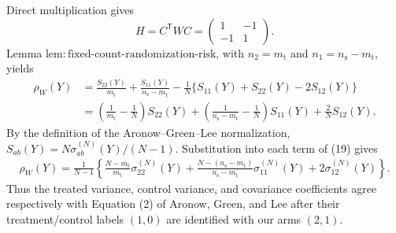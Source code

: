 Direct multiplication gives
\[
H=C^{\mathsf T}WC=
\begin{pmatrix}1&-1\\-1&1\end{pmatrix}. \tag{18}
\]
Lemma \(\mathrm{lem{:}fixed\text{-}count\text{-}randomization\text{-}risk}\), with \(n_2=m_{\mathrm t}\) and \(n_1=n_{\mathrm s}-m_{\mathrm t}\), yields
\[
\begin{aligned}
\rho_W(Y)
&=\frac{S_{22}(Y)}{m_{\mathrm t}}
+\frac{S_{11}(Y)}{n_{\mathrm s}-m_{\mathrm t}}
-\frac1N\{S_{11}(Y)+S_{22}(Y)-2S_{12}(Y)\}\\
&=\left(\frac1{m_{\mathrm t}}-\frac1N\right)S_{22}(Y)
+\left(\frac1{n_{\mathrm s}-m_{\mathrm t}}-\frac1N\right)S_{11}(Y)
+\frac2N S_{12}(Y). \tag{19}
\end{aligned}
\]
By the definition of the Aronow--Green--Lee normalization,
\(S_{ab}(Y)=N\sigma_{ab}^{(N)}(Y)/(N-1)\).  Substitution into each term of (19) gives
\[
\begin{aligned}
\rho_W(Y)
=\frac1{N-1}\left\{
\frac{N-m_{\mathrm t}}{m_{\mathrm t}}\sigma_{22}^{(N)}(Y)
+\frac{N-(n_{\mathrm s}-m_{\mathrm t})}{n_{\mathrm s}-m_{\mathrm t}}\sigma_{11}^{(N)}(Y)
+2\sigma_{12}^{(N)}(Y)\right\}. \tag{20}
\end{aligned}
\]
Thus the treated variance, control variance, and covariance coefficients agree respectively with Equation (2) of Aronow, Green, and Lee after their treatment/control labels \((1,0)\) are identified with our arms \((2,1)\).

